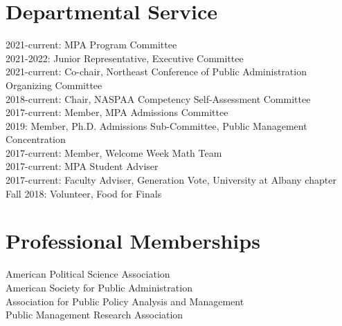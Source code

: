 \documentclass[margin,line]{res}
\begin{document}
\begin{resume}
\section{\sc Departmental Service}
2021-current: MPA Program Committee\\
2021-2022: Junior Representative, Executive Committee\\
2021-current: Co-chair, Northeast Conference of Public Administration Organizing Committee\\
2018-current: Chair, NASPAA Competency Self-Assessment Committee\\
2017-current: Member, MPA Admissions Committee\\
2019: Member, Ph.D. Admissions Sub-Committee, Public Management Concentration\\
2017-current: Member, Welcome Week Math Team\\
2017-current: MPA Student Adviser\\
2017-current: Faculty Adviser, Generation Vote, University at Albany chapter\\
Fall 2018: Volunteer, Food for Finals\\

\section{\sc Professional Memberships}
American Political Science Association \\
American Society for Public Administration \\
Association for Public Policy Analysis and Management \\
Public Management Research Association

\end{resume}
\end{document}
